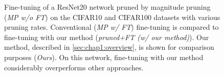 \begin{figure}
\centering
{}
  \caption{ Fine-tuning of a ResNet20 network pruned by magnitude pruning
  (\emph{MP w/o FT}) on the CIFAR10 and CIFAR100 datasets with various pruning
  rates. Conventional (\emph{MP w/ FT}) fine-tuning is compared to fine-tuning
  with our method (\emph{pruned+FT (w/ our method)}). Our method, described in
  \cref{sec:chap1:overview}, is shown for comparison purposes (\emph{Ours}). On
  this network, fine-tuning with our method considerably overperforms other
  approaches.}
    \label{fig:chap1:finetuning_impact_resnet20}
\end{figure}


